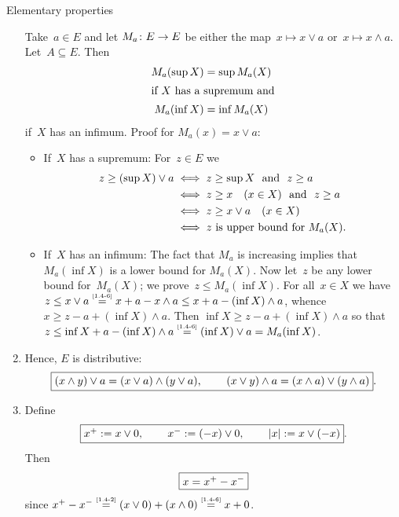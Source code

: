 \documentclass[main.tex]{subfiles}
\begin{document}
\begin{psec}{Elementary properties}
\begin{enumerate}
\label{1.4-7}
Take~$a\in E$ and let $M_a\colon E\rightarrow E$ 
be either the map~$x\mapsto x\vee a$
or~$x\mapsto x\wedge a$. 
Let~$A\subseteq E$.
Then
\begin{align*}
M_a(\sup X) &= \sup M_a(X) \\
\intertext{%
if $X$ has a supremum and}
M_a(\inf X) &= \inf M_a(X)
\end{align*}
if~$X$ has an infimum.
Proof for $M_a(x)=x\vee a$:
\begin{itemize}
\item %
If~$X$ has a supremum:  
For~$z\in E$ we
\begin{align*}
z\ge (\sup X)\vee a  
  & \iff z\ge \sup X\ \textnormal{ and }\  z\ge a \\
  & \iff z\ge x\quad (x\in X)\ \textnormal{ and }\  z\ge a\\
  & \iff z\ge x\vee a\quad (x\in X) \\
  & \iff z\textnormal{ is upper bound for }M_a(X)\textnormal{.}
\end{align*}
\item %
If~$X$ has an infimum: 
The fact that $M_a$ is increasing 
implies that $M_a(\inf X)$ is a lower bound
for $M_a(X)$.
Now let~$z$
be any lower bound for~$M_a(X)$;
we prove~$z\leq M_a(\inf X)$.
For all~$x\in X$
we have
$z\leq x\vee a 
\isref{1.4-6}
x+a - x\wedge a
\leq x+a-(\inf X)\wedge a$,
whence
$x\ge z-a+(\inf X)\wedge a$.
Then $\inf X\geq z-a+(\inf X)\wedge a$
so that 
$z\leq \inf X +a - (\inf X)\wedge a
\isref{1.4-6}
(\inf X)\vee a = M_a(\inf X)$.
\end{itemize}
\item %
\label{1.4-8}
Hence, $E$ is distributive:
\begin{equation*}
\fbox{$ (x\wedge y)\vee a = (x\vee a)\wedge(y\vee a)
\textnormal{, }\qquad
(x\vee y)\wedge a = (x\wedge a)\vee (y\wedge a) $}
\textnormal{.}
\end{equation*}
\item %
\label{1.4-9}
Define
\begin{equation*}
\frmd{%
x^+ := x\vee 0\htam{, }\qquad
x^- := (-x)\vee 0\htam{, }\qquad
|x| := x\vee(-x)}
\htam{.}
\end{equation*}
Then 
\begin{equation*}
\fbox{$  x = x^+ - x^-  $}
\end{equation*}
since $x^+ - x^-
\isref{1.4-2}(x\vee 0)+(x\wedge 0) 
\isref{1.4-6}x+0$.


\end{enumerate}
\end{psec}
\end{document}
